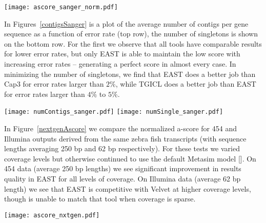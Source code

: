 \documentclass{bioinfo}
\newcommand{\capthree} {{\small Cap3}}
\newcommand{\metasim} {{\small MetaSim}}
\newcommand{\tgicl} {{\small TGICL}}
\newcommand{\east} {{\small EAST}}
\newcommand{\velvet}{{\small Velvet}}
\begin{document}
\begin{figure*}[htb]
\centerline{\texttt{[image: ascore\_sanger\_norm.pdf]}}
\caption{Average normalized a-score as a function of base error rate for
  simulated Sanger sequencing.  \east=blue, \capthree=Black,
  \tgicl=green. COMMENT: Need to change figure heading to Normalized a-score.}
\label{sangerAscore}
\end{figure*}

In Figures~\ref{contigsSanger} is a plot of the average number of
contigs per gene sequence as a function of error rate (top row), the
number of singletons is shown on the bottom row.  For the first we
observe that all tools have comparable results for lower error rates,
but only \east\/ is able to maintain the low score with increasing
error rates -- generating a perfect score in almost every case.  In
minimizing the number of singletons, we find that \east\/ does a
better job than \capthree\/ for error rates larger than $2\%$, while
\tgicl\/ does a better job than \east\/ for error rates larger than
$4\%$ to $5\%$.

\begin{figure*}[htb]
\texttt{[image: numContigs\_sanger.pdf]}
\texttt{[image: numSingle\_sanger.pdf]}
\caption{Number of contigs (normalized to the number of transcripts)
  and number of singletons as a function of base-call error
  rate for simulated Sanger sequencing.}
\label{contigsSanger}
\end{figure*}

\vspace{3mm}

 In
Figure~\ref{nextgenAscore} we compare the normalized a-score for 454
and Illumina outputs derived from the same zebra fish transcripts
(with sequence lengths averaging 250 bp and 62 bp respectively).  For
these tests we varied coverage levels but otherwise continued to use
the default Metasim model [\cite{Richter08}].  On 454 data (average
250 bp lengths) we see significant improvement in results quality in
\east\/ for all levels of coverage.  On Illumina data (average 62 bp
length) we see that \east\/ is competitive with \velvet\/ at higher
coverage levels, though is unable to match that tool when coverage is
sparse.

\begin{figure*}[htb]
\centerline{\texttt{[image: ascore\_nxtgen.pdf]}}
\caption{Comparative normalized a-scores for 454 and Illumina sequence
  output, using the \metasim default model at different levels
  of coverage.}
\label{nextgenAscore}
\end{figure*}
\end{document}
